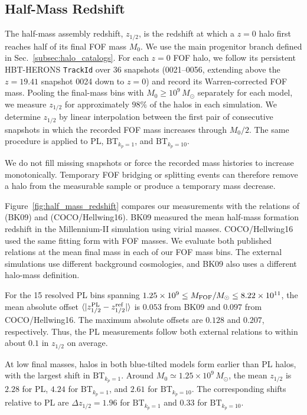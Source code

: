 \documentclass[
 reprint,
 superscriptaddress,
 nofootinbib,
 nobibnotes,
 amsmath,
 amssymb,
 aps,
 prd,
 floatfix,
 longbibliography
]{revtex4-2}
\DeclareRobustCommand{\change}[1]{#1}
\DeclareRobustCommand{\BTKPone}{\ensuremath{\mathrm{BT}_{k_p=1}}}
\DeclareRobustCommand{\BTKPten}{\ensuremath{\mathrm{BT}_{k_p=10}}}
\begin{document}
\subsection{Half-Mass Redshift\label{subsub:HMR}}
\change{The half-mass assembly redshift, \(z_{1/2}\), is the redshift at which a \(z=0\) halo first reaches half of its final FOF mass \(M_0\). We use the main progenitor branch defined in Sec.~\ref{subsec:halo_catalogs}. For each \(z=0\) FOF halo, we follow its persistent \textsc{HBT-HERONS} \texttt{TrackId} over 36 snapshots (0021--0056, extending above the \(z=19.41\) snapshot 0024 down to \(z=0\)) and record its Warren-corrected FOF mass. Pooling the final-mass bins with \(M_0\ge 10^9\,M_\odot\) separately for each model, we measure \(z_{1/2}\) for approximately \(98\%\) of the halos in each simulation. We determine \(z_{1/2}\) by linear interpolation between the first pair of consecutive snapshots in which the recorded FOF mass increases through \(M_0/2\). The same procedure is applied to PL, \BTKPone{}, and \BTKPten{}.}

We do not fill missing snapshots or force the recorded mass histories to increase monotonically. Temporary FOF bridging or splitting events can therefore remove a halo from the measurable sample or produce a temporary mass decrease.

Figure~\ref{fig:half_mass_redshift} compares our measurements with the relations of \citet{BoylanKolchin2009MSII} (BK09) and \citet{Hellwing16cocoproject} (COCO/Hellwing16). BK09 measured the mean half-mass formation redshift in the Millennium-II simulation using virial masses. COCO/Hellwing16 used the same fitting form with FOF masses. We evaluate both published relations at the mean final mass in each of our FOF mass bins. The external simulations use different background cosmologies, and BK09 also uses a different halo-mass definition.

For the 15 resolved PL bins spanning \(1.25\times10^9\le M_{\rm FOF}/M_\odot\le8.22\times10^{11}\), the mean absolute offset \(\langle|z_{1/2}^{\rm PL}-z_{1/2}^{\rm ref}|\rangle\) is \(0.053\) from BK09 and \(0.097\) from COCO/Hellwing16. The maximum absolute offsets are \(0.128\) and \(0.207\), respectively. Thus, the PL measurements follow both external relations to within about \(0.1\) in \(z_{1/2}\) on average.

\change{At low final masses, halos in both blue-tilted models form earlier than PL halos, with the largest shift in \BTKPone{}. Around \(M_0\simeq1.25\times10^9\,M_\odot\), the mean \(z_{1/2}\) is \(2.28\) for PL, \(4.24\) for \BTKPone{}, and \(2.61\) for \BTKPten{}. The corresponding shifts relative to PL are \(\Delta z_{1/2}=1.96\) for \BTKPone{} and \(0.33\) for \BTKPten{}.}
\end{document}
